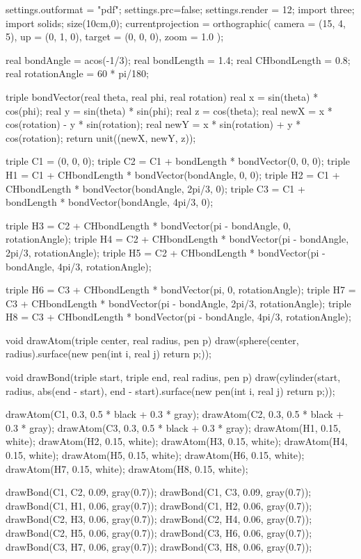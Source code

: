 \documentclass[border=3pt]{standalone}
\begin{document}
	\begin{asy}
	settings.outformat = "pdf";
	settings.prc=false; 
	settings.render = 12;
	import three;
	import solids;
	size(10cm,0);
	currentprojection = orthographic(
	camera = (15, 4, 5),
	up = (0, 1, 0),
	target = (0, 0, 0),
	zoom = 1.0
	);
	
	real bondAngle = acos(-1/3);
	real bondLength = 1.4;
	real CHbondLength = 0.8;
	real rotationAngle = 60 * pi/180;
	
	triple bondVector(real theta, real phi, real rotation) {
	real x = sin(theta) * cos(phi);
	real y = sin(theta) * sin(phi);
	real z = cos(theta);
	real newX = x * cos(rotation) - y * sin(rotation);
	real newY = x * sin(rotation) + y * cos(rotation);
	return unit((newX, newY, z));
	}
	
	triple C1 = (0, 0, 0);
	triple C2 = C1 + bondLength * bondVector(0, 0, 0);
	triple H1 = C1 + CHbondLength * bondVector(bondAngle, 0, 0);
	triple H2 = C1 + CHbondLength * bondVector(bondAngle, 2pi/3, 0);
	triple C3 = C1 + bondLength * bondVector(bondAngle, 4pi/3, 0);
	
	triple H3 = C2 + CHbondLength * bondVector(pi - bondAngle, 0, rotationAngle);
	triple H4 = C2 + CHbondLength * bondVector(pi - bondAngle, 2pi/3, rotationAngle);
	triple H5 = C2 + CHbondLength * bondVector(pi - bondAngle, 4pi/3, rotationAngle);
	
	triple H6 = C3 + CHbondLength * bondVector(pi, 0, rotationAngle);
	triple H7 = C3 + CHbondLength * bondVector(pi - bondAngle, 2pi/3, rotationAngle);
	triple H8 = C3 + CHbondLength * bondVector(pi - bondAngle, 4pi/3, rotationAngle);
	
	void drawAtom(triple center, real radius, pen p) {
	draw(sphere(center, radius).surface(new pen(int i, real j) {return p;}));
	}
	
	void drawBond(triple start, triple end, real radius, pen p) {
	draw(cylinder(start, radius, abs(end - start), end - start).surface(new pen(int i, real j) {return p;}));
	}
	
	drawAtom(C1, 0.3, 0.5 * black + 0.3 * gray);
	drawAtom(C2, 0.3, 0.5 * black + 0.3 * gray);
	drawAtom(C3, 0.3, 0.5 * black + 0.3 * gray);
	drawAtom(H1, 0.15, white);
	drawAtom(H2, 0.15, white);
	drawAtom(H3, 0.15, white);
	drawAtom(H4, 0.15, white);
	drawAtom(H5, 0.15, white);
	drawAtom(H6, 0.15, white);
	drawAtom(H7, 0.15, white);
	drawAtom(H8, 0.15, white);
	
	drawBond(C1, C2, 0.09, gray(0.7));
	drawBond(C1, C3, 0.09, gray(0.7));
	drawBond(C1, H1, 0.06, gray(0.7));
	drawBond(C1, H2, 0.06, gray(0.7));
	drawBond(C2, H3, 0.06, gray(0.7));
	drawBond(C2, H4, 0.06, gray(0.7));
	drawBond(C2, H5, 0.06, gray(0.7));
	drawBond(C3, H6, 0.06, gray(0.7));
	drawBond(C3, H7, 0.06, gray(0.7));
	drawBond(C3, H8, 0.06, gray(0.7));
	\end{asy}
\end{document}
